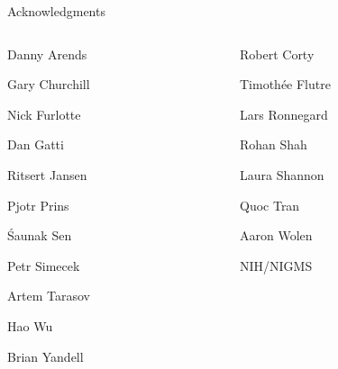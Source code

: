 \documentclass[aspectratio=169,12pt,t]{beamer}
\begin{document}
\begin{frame}[c]{Acknowledgments}

\begin{columns}[T]
  \begin{column}[T]{0.5\textwidth}
    \vspace{0pt}
\bi
\item[] Danny Arends
\item[] Gary Churchill
\item[] Nick Furlotte
\item[] Dan Gatti
\item[] Ritsert Jansen
\item[] Pjotr Prins
\item[] \'Saunak Sen
\item[] Petr Simecek
\item[] Artem Tarasov
\item[] Hao Wu
\item[] Brian Yandell
  \ei
  \end{column} \hfill
\begin{column}[T]{0.5\textwidth}
\vspace*{0mm}

  \bi
\item[] Robert Corty
\item[] Timoth\'ee Flutre
\item[] Lars Ronnegard
\item[] Rohan Shah
\item[] Laura Shannon
\item[] Quoc Tran
\item[] Aaron Wolen
\item[]
\item[] NIH/NIGMS
  \ei
\end{column}
\end{columns}

\end{frame}
\end{document}
